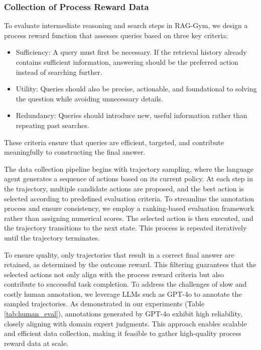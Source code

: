 \subsubsection{Collection of Process Reward Data} \label{sec:process_collect}

To evaluate intermediate reasoning and search steps in RAG-Gym, we design a process reward function that assesses queries based on three key criteria: 
\begin{itemize}
    \item Sufficiency: A query must first be necessary. If the retrieval history already contains sufficient information, answering should be the preferred action instead of searching further.
    \item Utility: Queries should also be precise, actionable, and foundational to solving the question while avoiding unnecessary details.
    \item Redundancy: Queries should introduce new, useful information rather than repeating past searches.
\end{itemize}
These criteria ensure that queries are efficient, targeted, and contribute meaningfully to constructing the final answer.

The data collection pipeline begins with trajectory sampling, where the language agent generates a sequence of actions based on its current policy. At each step in the trajectory, multiple candidate actions are proposed, and the best action is selected according to predefined evaluation criteria. To streamline the annotation process and ensure consistency, we employ a ranking-based evaluation framework rather than assigning numerical scores. The selected action is then executed, and the trajectory transitions to the next state. This process is repeated iteratively until the trajectory terminates.

To ensure quality, only trajectories that result in a correct final answer are retained, as determined by the outcome reward. This filtering guarantees that the selected actions not only align with the process reward criteria but also contribute to successful task completion. To address the challenges of slow and costly human annotation, we leverage LLMs such as GPT-4o to annotate the sampled trajectories. As demonstrated in our experiments (Table \ref{tab:human_eval}), annotations generated by GPT-4o exhibit high reliability, closely aligning with domain expert judgments. This approach enables scalable and efficient data collection, making it feasible to gather high-quality process reward data at scale.

